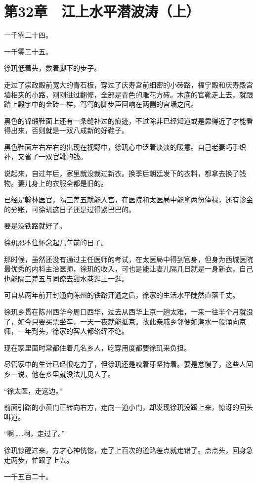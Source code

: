 \section{第32章　江上水平潜波涛（上）}

一千零二十四。

一千零二十五。

徐玑低着头，数着脚下的步子。

走过了崇政殿前宽大的青石板，穿过了庆寿宫前细密的小砖路，福宁殿和庆寿殿宫墙相夹的小路，刚刚进过翻修，全部是青色的雕花方砖。木底的官靴走上去，就跟踏上殿宇中的金砖一样，笃笃的脚步声回响在两侧的宫墙之间。

黑色的锦缎鞋面上还有一条缝补过的痕迹，不过除非已经知道或是靠得近了才能看得出来，否则就是一双八成新的好鞋子。

黑色鞋面左右左右的出现在视野中，徐玑心中泛着淡淡的暖意。自己老妻巧手织补，又省了一双官靴的钱。

说起来，自过年后，家里就没裁过新衣。换季后朝廷发下的衣料，都拿去换了钱物。妻儿身上的衣服全都是旧的。

已经是翰林医官，隔三差五就能入宫，在医院和太医局中能拿两份俸禄，还有诊金的分账，可徐玑这日子还是过得紧巴巴的。

要是没铁路就好了。

徐玑忍不住怀念起几年前的日子。

那时候，虽然还没有通过主任医师的考试，在太医局中得到官身，但身为西城医院最优秀的内科主治医师，徐玑的收入，可也是能让妻儿隔几日就是一身新衣，自己也能隔三差五与同僚去甜水巷逛上一逛。

可自从两年前开封通向陈州的铁路开通之后，徐家的生活水平陡然直落千丈。

徐玑乡贯在陈州西华今周口西华，过去从西华上京一趟太难，一来一往半个月就没了，如今只要买票坐车，一天一夜就能抵京。故此亲戚乡邻便如潮水一般涌向京师，一年到头，徐家的客人都络绎不绝。

现在家里面时常都住着几名乡人，吃穿用度都要徐玑来负担。

尽管家中的生计已经很吃力了，但徐玑还是咬着牙坚持着。要是怠慢了，这些人回乡一说，他在乡里就没法儿见人了。

“徐太医，走这边。”

前面引路的小黄门正转向右方，走向一道小门，却发现徐玑没跟上来，惊讶的回头叫道。

“啊……啊，走过了。”

徐玑惊醒过来，方才心神恍惚，走了上百次的道路差点就走错了。点点头，回身急走两步，忙跟了上去。

一千五百二十。

